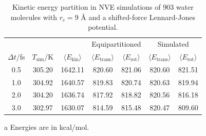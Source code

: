 \documentclass[aip,jcp,reprint,amsmath,amssymb,raggedbottom]{revtex4-1}
\begin{document}
\begin{table}
	\begin{threeparttable}
		\caption{Kinetic energy partition in NVE simulations of 903 water molecules with $r_c = 9$ {\AA} and a shifted-force Lennard-Jones potential.} %
		\label{table:water_partition_LJ-SF}
		\begin{ruledtabular}
			\begin{tabular}{ccccccc}
				& & & \multicolumn{2}{c}{Equipartitioned} & \multicolumn{2}{c}{Simulated}\\
				\cline{4-7}
				$\Delta t$/fs & $T_\text{sim}$/K & $\langle E_\text{kin}\rangle$ & $\langle E_\text{trans}\rangle$ & $\langle E_\text{rot}\rangle$ & $\langle E_\text{trans}\rangle$ & $\langle E_\text{rot}\rangle$ \\
				\hline
				0.5 & 305.20  & 1642.11  & 820.60  & 821.06  & 820.60 & 821.51  \\
				1.0 & 304.92  & 1640.57  & 819.83  & 820.74  & 820.63 & 819.94  \\
				2.0 & 304.20  & 1636.74  & 817.92  & 818.82  & 820.56 & 816.18  \\
				3.0 & 302.97  & 1630.07  & 814.59  & 815.48  & 820.47 & 809.60
			\end{tabular}
		\end{ruledtabular}
		\begin{tablenotes}
			\item[a] Energies are in kcal/mol.
		\end{tablenotes}
	\end{threeparttable}
\end{table}
\end{document}
